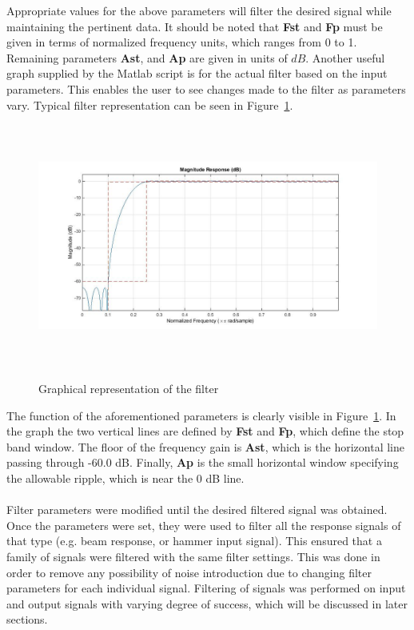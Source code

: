 \documentclass[paper=a4, fontsize=12pt]{scrartcl} %
\begin{document}
%
Appropriate values for the above parameters will filter the desired signal while maintaining the pertinent data. It should be noted that \textbf{Fst} and \textbf{Fp} must be given in terms of normalized frequency units, which ranges from 0 to 1. Remaining parameters \textbf{Ast}, and \textbf{Ap} are given in units of $dB$. Another useful graph supplied by the Matlab script is for the actual filter based on the input parameters. This enables the user to see changes made to the filter as parameters vary. Typical filter representation can be seen in Figure~\ref{fig:FilterDesign}.
%
	\begin{figure}[H]
		\centering
		{
		\includegraphics[height=8.0cm]{FilterDesign.jpg}
		}
		\caption{Graphical representation of the filter}
		\label{fig:FilterDesign}
	\end{figure}
%
The function of the aforementioned parameters is clearly visible in Figure~\ref{fig:FilterDesign}. In the graph the two vertical lines are defined by \textbf{Fst} and \textbf{Fp}, which define the stop band window. The floor of the frequency gain is \textbf{Ast}, which is the horizontal line passing through -60.0 dB. Finally, \textbf{Ap} is the small horizontal window specifying the allowable ripple, which is near the 0 dB line.
\\
\\
Filter parameters were modified until the desired filtered signal was obtained. Once the parameters were set, they were used to filter all the response signals of that type (e.g. beam response, or hammer input signal). This ensured that a family of signals were filtered with the same filter settings. This was done in order to remove any possibility of noise introduction due to changing filter parameters for each individual signal. Filtering of signals was performed on input and output signals with varying degree of success, which will be discussed in later sections.
\end{document}
